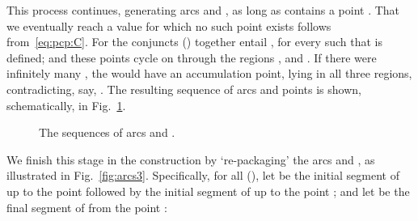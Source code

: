 \documentclass{article}
\begin{document}
This process continues, generating arcs  and , as
long as  contains a point . That we
eventually reach a value  for which no such point exists
follows from~\eqref{eq:pcp:C}. For the conjuncts  () together entail , for every
 such that  is defined; and these points cycle on 
through the regions ,  and . If there were
infinitely many , the  would have an accumulation point,
lying in all three regions, contradicting, say, .  The resulting sequence of arcs and points is
shown, schematically, in Fig.~\ref{fig:arcs2}.
\begin{figure}
\caption{The sequences of arcs  and .}
\label{fig:arcs2}
\end{figure}

We finish this stage in the construction by `re-packaging' the arcs
 and , as illustrated in
Fig.~\ref{fig:arcs3}. Specifically,
for all  (), let  be the initial segment
of  up to the point  followed by the initial segment
of  up to the point ; and let  be the
final segment of  from the point :
\end{document}
